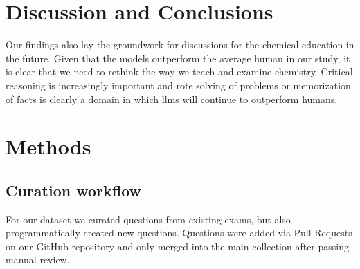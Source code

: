 \documentclass[11pt, oneside]{article}
\begin{document}
\begin{refsection}
\section{Discussion and Conclusions}
Our findings also lay the groundwork for discussions for the chemical education in the future. 
Given that the models outperform the average human in our study, it is clear that we need to rethink the way we teach and examine chemistry.
Critical reasoning is increasingly important and rote solving of problems or memorization of facts is clearly a domain in which \glspl{llm} will continue to outperform humans.








\section{Methods}

\subsection{Curation workflow}\label{sec:curation}
For our dataset we curated questions from existing exams, but also programmatically created new questions.
Questions were added via Pull Requests on our GitHub repository and only merged into the main collection after passing manual review.


\end{refsection}
\end{document}
